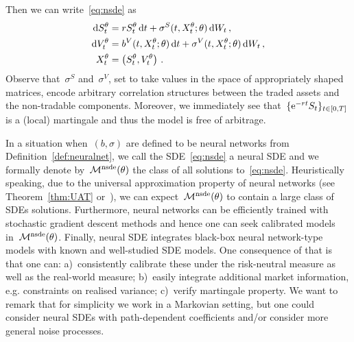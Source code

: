 Then we can write~\eqref{eq:nsde} as
\begin{equation}\label{eq:nsde2}
\begin{split}
\mathrm{d} S^{\theta}_t & = r S_t^{\theta} \,\mathrm{d} t + \sigma^S(t,X_t^\theta;\theta )\,\mathrm{d} W_t\,,\\
\mathrm{d} V^\theta_t & = b^V(t,X_t^{\theta}; \theta) \,\mathrm{d} t + \sigma^V(t,X_t^\theta;\theta )\,\mathrm{d} W_t\,,\\
X^\theta_t & = \left(S^\theta_t, V^\theta_t\right)	\,.
\end{split}
\end{equation}
Observe that~$\sigma^S$ and~$\sigma^V$, set to take values in the space of appropriately shaped matrices, encode arbitrary correlation structures between the traded assets and the non-tradable components.
Moreover, we immediately see that~$\{\mathrm{e}^{-rt}S_t\}_{t\in[0, T]}$ is a (local) martingale and thus the model is free of arbitrage. 

In a situation when~$(b,\sigma)$ are defined to be neural networks from Definition~\ref{def:neuralnet}, we call the SDE~\eqref{eq:nsde} a neural SDE and we formally denote by~$\mathcal{M}^{\text{nsde}}(\theta)$ the class of all solutions to~\eqref{eq:nsde}. 
Heuristically speaking, due to the universal approximation property of neural networks (see Theorem~\ref{thm:UAT} or~\cite{Hornik1991ApproximationNetworks, Sontag1997CompleteNetworks, Cuchiero2019DeepODEs}), we can expect~$\mathcal{M}^{\text{nsde}}(\theta)$ to contain a large class of SDEs solutions.
Furthermore, neural networks can be efficiently trained with stochastic gradient descent methods and hence one can seek calibrated models in~$\mathcal{M}^{\text{nsde}}(\theta)$. 
Finally, neural SDE integrates black-box neural network-type models with known and well-studied SDE models. 
One consequence of that is that one can: a)~consistently calibrate these under the risk-neutral measure as well as the real-world measure; b)~easily integrate additional market information, e.g. constraints on realised variance; c)~verify martingale property. We want to remark that for simplicity we work in a Markovian setting, but one could consider neural SDEs with path-dependent coefficients and/or consider more general noise processes.

